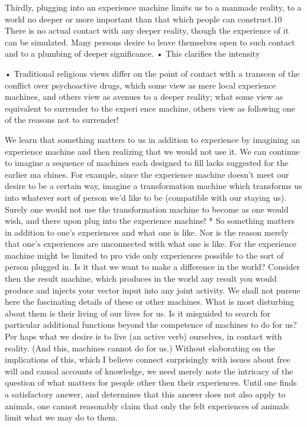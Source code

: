 \documentclass[11pt,openany]{book}
\begin{document}
Thirdly, plugging into an experience machine limits us to a manmade reality, to a world no deeper or more important than that which people can construct.10 There is no actual contact with any deeper reality, though the experience of it can be simulated. Many persons desire to leave themselves open to such contact and to a plumbing of deeper significance. • This clarifies the intensity 

• Traditional religious views differ on the point of contact with a transcen of the conflict over psychoactive drugs, which some view as mere local experience machines, and others view as avenues to a deeper reality; what some view as equivalent to surrender to the experi ence machine, others view as following one of the reasons not to surrender! 

We learn that something matters to us in addition to experience by imagining an experience machine and then realizing that we would not use it. We can continue to imagine a sequence of machines each designed to fill lacks suggested for the earlier ma chines. For example, since the experience machine doesn't meet our desire to be a certain way, imagine a transformation machine which transforms us into whatever sort of person we'd like to be (compatible with our staying us). Surely one would not use the transformation machine to become as one would wish, and there upon plug into the experience machine! * So something matters in addition to one's experiences and what one is like. Nor is the reason merely that one's experiences are unconnected with what one is like. For the experience machine might be limited to pro vide only experiences possible to the sort of person plugged in. Is it that we want to make a difference in the world? Consider then the result machine, which produces in the world any result you would produce and injects your vector input into any joint activity. We shall not pursue here the fascinating details of these or other machines. What is most disturbing about them is their living of our lives for us. Is it misguided to search for particular additional functions beyond the competence of machines to do for us? Per haps what we desire is to live (an active verb) ourselves, in contact with reality. (And this, machines cannot do for us.) Without elaborating on the implications of this, which I believe connect surprisingly with issues about free will and causal accounts of knowledge, we need merely note the intricacy of the question of what matters for people other then their experiences. Until one finds a satisfactory answer, and determines that this answer does not also apply to animals, one cannot reasonably claim that only the felt experiences of animals limit what we may do to them. 
\end{document}
